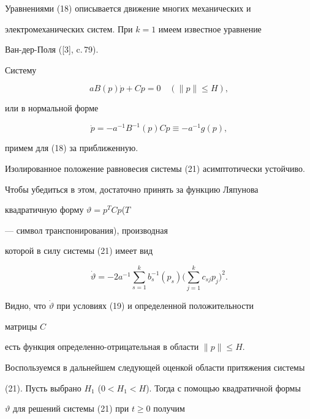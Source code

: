 Уравнениями (18) описывается движение многих механических и  


электромеханических систем. При $k=1$ имеем известное уравнение 


Ван-дер-Поля ([3], c.\,79). 


Систему 


\begin{equation} 


a B(p)\Dot p+C p=0\quad (\|p\|\le H), 


\end{equation} 


или в нормальной форме 


\begin{equation} 


\Dot p=-a^{-1}B^{-1}(p)C p\equiv-a^{-1}g(p),


\end{equation} 


примем для (18) за приближенную. 


 


Изолированное положение равновесия системы (21) асимптотически устойчиво.  


Чтобы убедиться в этом, достаточно принять за функцию Ляпунова  


квадратичную форму $\vartheta=p^T C p$\linebreak (${\scriptstyle T}$


--- символ транспонирования), производная  


которой в силу системы (21) имеет вид 


$$ 


\Dot\vartheta=-2a^{-1}\sum^k_{s=1}b^{-1}_s(p_s) 


\biggl(\sum^k_{j=1}c_{sj}p_j \biggr)^2. 


$$  


Видно, что $\Dot\vartheta$ при условиях (19) и определенной положительности 


матрицы $C$ 


есть функция определенно-отрицательная в области $\|p\|\le H$. 


 


Воспользуемся в дальнейшем следующей оценкой области притяжения системы 


(21). Пусть выбрано $H_1$ ($0<H_1<H$). Тогда с помощью квадратичной формы  


$\vartheta$ для решений системы (21) при $t\ge 0$ получим 


